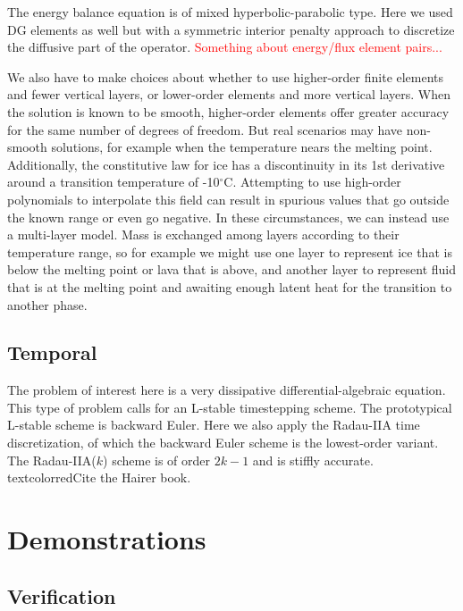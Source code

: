 \documentclass{article}
\theoremstyle{definition}
\theoremstyle{plain}
\begin{document}
The energy balance equation is of mixed hyperbolic-parabolic type.
Here we used DG elements as well but with a symmetric interior penalty approach to discretize the diffusive part of the operator.
\textcolor{red}{Something about energy/flux element pairs...}

We also have to make choices about whether to use higher-order finite elements and fewer vertical layers, or lower-order elements and more vertical layers.
When the solution is known to be smooth, higher-order elements offer greater accuracy for the same number of degrees of freedom.
But real scenarios may have non-smooth solutions, for example when the temperature nears the melting point.
Additionally, the constitutive law for ice has a discontinuity in its 1st derivative around a transition temperature of -10${}^\circ$C.
Attempting to use high-order polynomials to interpolate this field can result in spurious values that go outside the known range or even go negative.
In these circumstances, we can instead use a multi-layer model.
Mass is exchanged among layers according to their temperature range, so for example we might use one layer to represent ice that is below the melting point or lava that is above, and another layer to represent fluid that is at the melting point and awaiting enough latent heat for the transition to another phase.

\subsection{Temporal}

The problem of interest here is a very dissipative differential-algebraic equation.
This type of problem calls for an L-stable timestepping scheme.
The prototypical L-stable scheme is backward Euler.
Here we also apply the Radau-IIA time discretization, of which the backward Euler scheme is the lowest-order variant.
The Radau-IIA($k$) scheme is of order $2k - 1$ and is stiffly accurate.
textcolor{red}{Cite the Hairer book.}



\section{Demonstrations}

\subsection{Verification}
\end{document}
